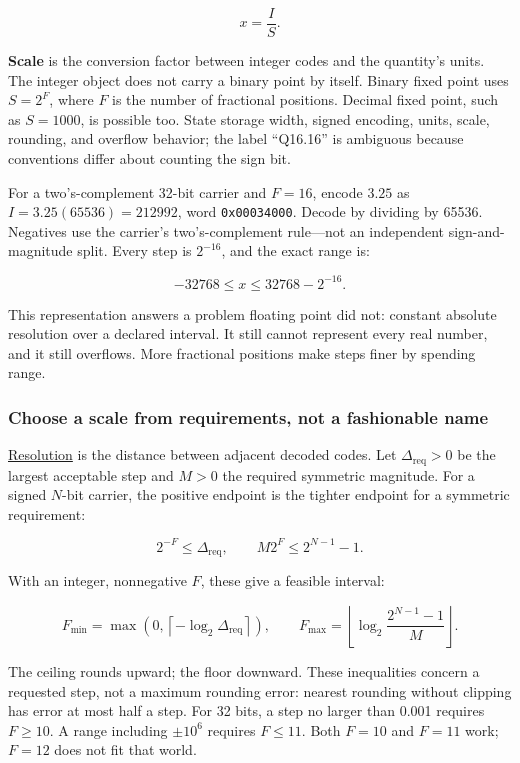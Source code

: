 \[
x=\frac{I}{S}.
\]

\textbf{Scale} is the conversion factor between integer codes and the quantity's units. The integer object does not carry a binary point by itself. Binary fixed point uses \(S=2^F\), where \(F\) is the number of fractional positions. Decimal fixed point, such as \(S=1000\), is possible too. State storage width, signed encoding, units, scale, rounding, and overflow behavior; the label ``Q16.16'' is ambiguous because conventions differ about counting the sign bit.

For a two's-complement 32-bit carrier and \(F=16\), encode \(3.25\) as \(I=3.25(65536)=212992\), word \texttt{0x00034000}. Decode by dividing by 65536. Negatives use the carrier's two's-complement rule---not an independent sign-and-magnitude split. Every step is \(2^{-16}\), and the exact range is:

\[
-32768\le x\le32768-2^{-16}.
\]

This representation answers a problem floating point did not: constant absolute resolution over a declared interval. It still cannot represent every real number, and it still overflows. More fractional positions make steps finer by spending range.

\subsubsection{Choose a scale from requirements, not a fashionable name}\label{01-foundations-i-ch001-choose-a-scale-from-requirements-not-a-fashionable-name}

\hypertarget{01-foundations-i-ch001-choose-a-scale-from-requirements-not-a-fashionable-name}{}

\hyperref[appendix-ceb4c4a9b5a1]{Resolution} is the distance between adjacent decoded codes. Let \(\Delta_{\mathrm{req}}>0\) be the largest acceptable step and \(M>0\) the required symmetric magnitude. For a signed \(N\)-bit carrier, the positive endpoint is the tighter endpoint for a symmetric requirement:

\[
2^{-F}\le\Delta_{\mathrm{req}},
\qquad
M2^F\le2^{N-1}-1.
\]

With an integer, nonnegative \(F\), these give a feasible interval:

\[
F_{\min}=\max\!\left(0,\left\lceil-\log_2\Delta_{\mathrm{req}}\right\rceil\right),
\qquad
F_{\max}=\left\lfloor\log_2\frac{2^{N-1}-1}{M}\right\rfloor.
\]

The ceiling rounds upward; the floor downward. These inequalities concern a requested step, not a maximum rounding error: nearest rounding without clipping has error at most half a step. For 32 bits, a step no larger than 0.001 requires \(F\ge10\). A range including \(\pm10^6\) requires \(F\le11\). Both \(F=10\) and \(F=11\) work; \(F=12\) does not fit that world.


